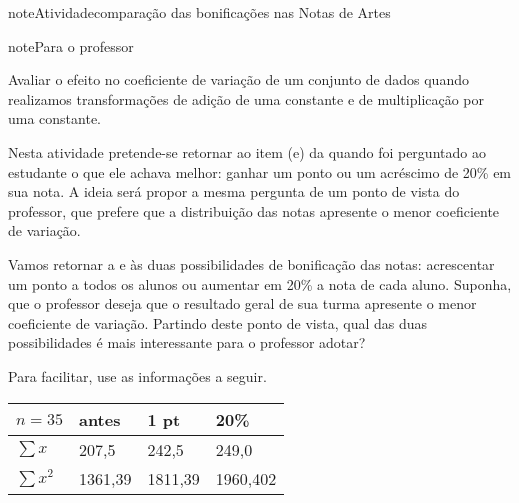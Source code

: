 \begin{sphinxadmonition}{note}{Atividade}{comparação das bonificações nas Notas de Artes}

\begin{sphinxadmonition}{note}{Para o professor}

 Avaliar o efeito no coeficiente de variação de um conjunto de dados quando realizamos transformações de adição de uma constante e de multiplicação por uma constante.

 Nesta atividade pretende-se retornar ao item (e) da  quando foi perguntado ao estudante o que ele achava melhor: ganhar um ponto ou um acréscimo de 20\% em sua nota. A ideia será propor a mesma pergunta de um ponto de vista do professor, que prefere que a distribuição das notas apresente o menor coeficiente de variação.
\end{sphinxadmonition}

Vamos retornar a  e às duas possibilidades de bonificação das notas: acrescentar um ponto a todos os alunos ou aumentar em 20\% a nota de cada aluno. Suponha, que o professor deseja que o resultado geral de sua turma apresente o menor coeficiente de variação. Partindo deste ponto de vista, qual das duas possibilidades é mais interessante para o professor adotar?

Para facilitar, use as informações a seguir.


\begin{savenotes}\sphinxattablestart
\centering
{}
\label{\detokenize{PE104-5:id5}}
\sphinxaftercaption
\begin{tabulary}{\linewidth}[t]{|T|T|T|T|}
\hline

\(n=35\)
&
antes
&
1 pt
&
20\%
\\
\hline
\(\sum x\)
&
207,5
&
242,5
&
249,0
\\
\hline
\(\sum x^2\)
&
1361,39
&
1811,39
&
1960,402
\\
\hline
\end{tabulary}
\par
\sphinxattableend\end{savenotes}
\end{sphinxadmonition}

